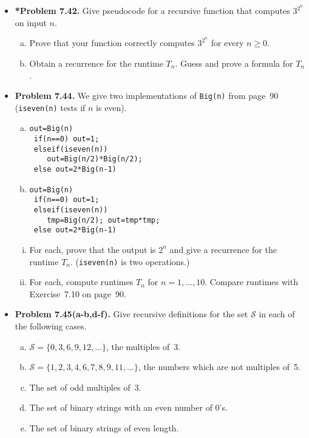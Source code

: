 \documentclass[11pt]{article}
\begin{document}
\begin{itemize}
\vspace{0.1in}

\item \textbf{*Problem 7.42.}
Give pseudocode for a recursive function that computes $3^{2^n}$ on input $n$.
\begin{enumerate}[(a)]
\item Prove that your function correctly computes $3^{2^n}$ for every $n\ge 0$.
\item Obtain a recurrence for the runtime $T_n$.
  Guess and prove a formula for $T_n$.
\end{enumerate}

\vspace{0.1in}

\item \textbf{Problem 7.44.}
We give two implementations of \verb+Big(n)+ from page~90
(\verb+iseven(n)+ tests if $n$ is even).
\begin{multicols}{2}
\begin{enumerate}[(a)]
\item
\begin{verbatim}
out=Big(n)
 if(n==0) out=1;
 elseif(iseven(n))
    out=Big(n/2)*Big(n/2);
 else out=2*Big(n-1)
\end{verbatim}
\item
\begin{verbatim}
out=Big(n)
 if(n==0) out=1;
 elseif(iseven(n))
    tmp=Big(n/2); out=tmp*tmp;
 else out=2*Big(n-1)
\end{verbatim}
\end{enumerate}
\end{multicols}

\begin{enumerate}[(i)]
\item For each, prove that the output is $2^n$ and give a recurrence for the runtime $T_n$.
  (\verb+iseven(n)+ is two operations.)
\item For each, compute runtimes $T_n$ for $n=1,\ldots,10$.
  Compare runtimes with Exercise~7.10 on page~90.
\end{enumerate}

\vspace{0.1in}

\item \textbf{Problem 7.45(a-b,d-f).}
Give recursive definitions for the set $\mathcal{S}$ in each of the following cases.
\begin{enumerate}[(a)]
\item $\mathcal{S}=\{0,3,6,9,12,\dots\}$, the multiples of~3.
\item $\mathcal{S}=\{1,2,3,4,6,7,8,9,11,\dots\}$, the numbers which are not multiples of~5.
\setcounter{enumi}{3}
\item The set of odd multiples of~3.
\item The set of binary strings with an even number of 0's.
\item The set of binary strings of even length.
\end{enumerate}


\end{itemize}
\end{document}

